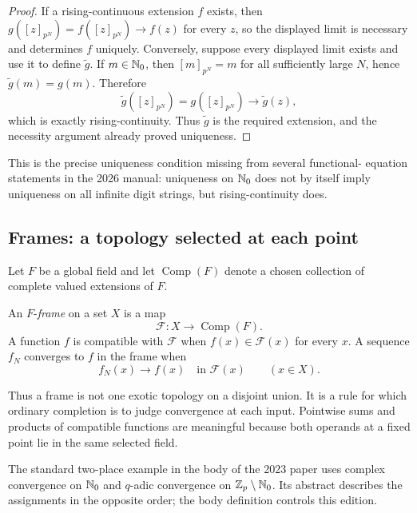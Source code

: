 \begin{proof}
If a rising-continuous extension $f$ exists, then
$g([z]_{p^N})=f([z]_{p^N})\to f(z)$ for every $z$, so the displayed limit is
necessary and determines $f$ uniquely.  Conversely, suppose every displayed
limit exists and use it to define $\widetilde g$.  If $m\in\mathbb N_0$, then
$[m]_{p^N}=m$ for all sufficiently large $N$, hence
$\widetilde g(m)=g(m)$.  Therefore
\[
 \widetilde g([z]_{p^N})=g([z]_{p^N})\longrightarrow\widetilde g(z),
\]
which is exactly rising-continuity.  Thus $\widetilde g$ is the required
extension, and the necessity argument already proved uniqueness.
\end{proof}

This is the precise uniqueness condition missing from several functional-
equation statements in the 2026 manual: uniqueness on $\mathbb N_0$ does not by
itself imply uniqueness on all infinite digit strings, but rising-continuity
does.

\subsection{Frames: a topology selected at each point}

Let $F$ be a global field and let $\operatorname{Comp}(F)$ denote a chosen
collection of complete valued extensions of $F$.

\begin{definition}[frame]
An $F$-\emph{frame} on a set $X$ is a map
\[
 \mathcal F:X\to\operatorname{Comp}(F).
\]
A function $f$ is compatible with $\mathcal F$ when
$f(x)\in\mathcal F(x)$ for every $x$.  A sequence $f_N$ converges to $f$ in
the frame when
\begin{equation}
\label{eq:frame-convergence}
 f_N(x)\longrightarrow f(x)\quad\text{in }\mathcal F(x)
 \qquad(x\in X).
\end{equation}
\end{definition}

Thus a frame is not one exotic topology on a disjoint union.  It is a rule
for which ordinary completion is to judge convergence at each input.
Pointwise sums and products of compatible functions are meaningful because
both operands at a fixed point lie in the same selected field.

The standard two-place example in the body of the 2023 paper uses complex
convergence on $\mathbb N_0$ and $q$-adic convergence on
$\mathbb Z_p\setminus\mathbb N_0$.  Its abstract describes the assignments in the opposite
order; the body definition controls this edition.

